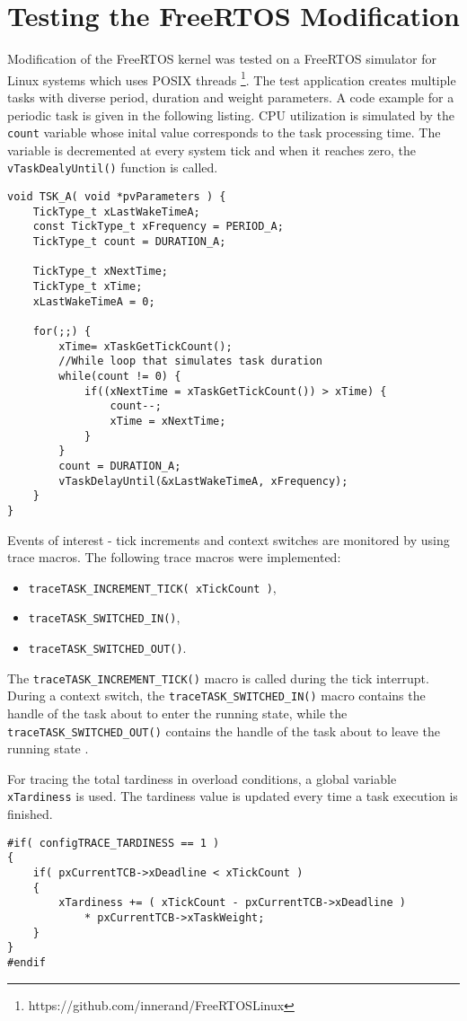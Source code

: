 \section{Testing the FreeRTOS Modification}
Modification of the FreeRTOS kernel was tested on a FreeRTOS simulator for Linux systems which uses POSIX threads \footnote{https://github.com/innerand/FreeRTOSLinux}.
The test application creates multiple tasks with diverse period, duration and weight parameters. 
A code example for a periodic task is given in the following listing.
CPU utilization is simulated by the \verb$count$ variable whose inital value corresponds to the task processing time. 
The variable is decremented at every system tick and when it reaches zero, the \verb$vTaskDealyUntil()$ function is called. 
\begin{lstlisting}[frame=none, label={periodic_task_freertos}, caption={Task function simulating a periodic task.}, captionpos=b]
void TSK_A( void *pvParameters ) {
    TickType_t xLastWakeTimeA;
    const TickType_t xFrequency = PERIOD_A;
    TickType_t count = DURATION_A;

    TickType_t xNextTime;
    TickType_t xTime;
    xLastWakeTimeA = 0;
    
    for(;;) {
        xTime= xTaskGetTickCount();
        //While loop that simulates task duration
        while(count != 0) {
            if((xNextTime = xTaskGetTickCount()) > xTime) {
                count--;
                xTime = xNextTime;
            }
        }
        count = DURATION_A;
        vTaskDelayUntil(&xLastWakeTimeA, xFrequency);
    }
}
\end{lstlisting}
Events of interest - tick increments and context switches are monitored by using trace macros. 
The following trace macros were implemented:
\begin{itemize}
	\item \verb$traceTASK_INCREMENT_TICK( xTickCount )$,
	\item \verb$traceTASK_SWITCHED_IN()$,
	\item \verb$traceTASK_SWITCHED_OUT()$.
\end{itemize}
The \verb$traceTASK_INCREMENT_TICK()$ macro is called during the tick interrupt.
During a context switch, the \verb$traceTASK_SWITCHED_IN()$ macro contains the handle of the task about to enter the running state, while the \verb$traceTASK_SWITCHED_OUT()$ contains the handle of the task about to leave the running state \cite{freertosref}. 

For tracing the total tardiness in overload conditions, a global variable \verb$xTardiness$ is used.
The tardiness value is updated every time a task execution is finished.
\begin{lstlisting}[frame=none, label={tardiness}, caption={Updating the \texttt{xTardiness} variable.}, captionpos=b]
#if( configTRACE_TARDINESS == 1 )
{
	if( pxCurrentTCB->xDeadline < xTickCount )
	{
		xTardiness += ( xTickCount - pxCurrentTCB->xDeadline ) 
			* pxCurrentTCB->xTaskWeight;
	}
}
#endif
\end{lstlisting}

